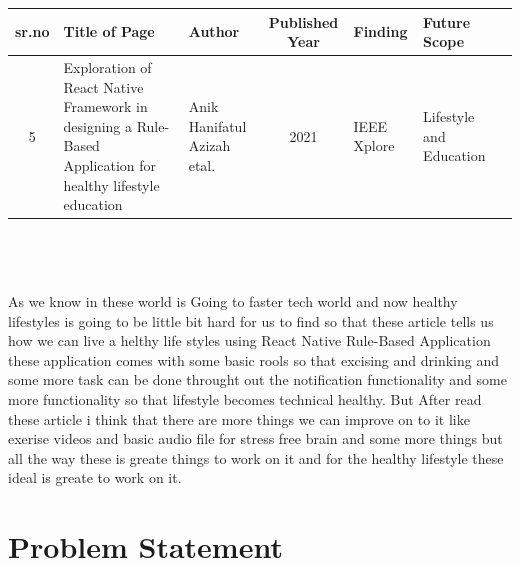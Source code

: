 \documentclass[12pt,a4paper]{article}
\begin{document}
\begin{tabular}{ |c | m{2.5cm} | m{2cm}| c | m{2cm} | m{2cm} | c | }

  \hline
  sr.no & Title of Page & Author & Published Year & Finding & Future Scope  \\ 
  \hline
 5 &  Exploration of React Native Framework in designing a Rule-Based Application for healthy lifestyle education & Anik Hanifatul Azizah etal. &  2021 & IEEE Xplore & Lifestyle and Education \\
\hline 
  
\end{tabular}
\\
\\
\\
As  we know in these world is Going to faster tech world and now healthy lifestyles is going to be little bit hard for us to find so that these article tells us how we can live a helthy life styles using React Native Rule-Based Application these application comes with some basic rools so that excising and drinking and some more task can be done throught out the notification functionality and some more functionality so that lifestyle becomes technical healthy. But After read these article i think that there are more things we can improve on to it like exerise videos and basic audio file for stress free brain and some more things but all the way these is greate things to work on it and for the healthy lifestyle these ideal is greate to work on it.

\newpage
\section*{Problem Statement}
\end{document}

